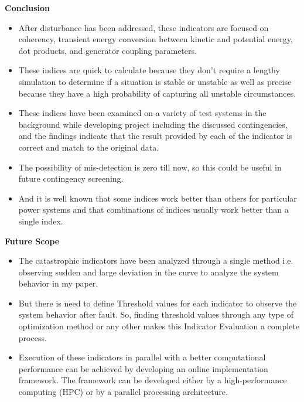 \documentclass [xcolor=svgnames, t] {beamer}
\begin{document}
\begin{frame}{\textbf{Conclusion}}
\begin{itemize} \justifying
\item After disturbance has been addressed, these indicators are focused on coherency, transient energy conversion between kinetic and potential energy, dot products, and generator coupling parameters.
\item These indices are quick to calculate because they don’t require a lengthy simulation to determine if a situation is stable or unstable as well as precise because they have a high probability of capturing all unstable circumstances.
\item These indices have been examined on a variety of test systems in the background while developing project including the discussed contingencies, and the findings indicate that the result provided by each of the indicator is correct and match to the original data. 
\item The possibility of mis-detection is zero till now, so this could be useful in future contingency screening.
\item And it is well known that some indices work better than others for particular power systems and that combinations of indices usually work better than a single index.

\end{itemize}
\end{frame}

\begin{frame}{\textbf{Future Scope
}}
\begin{itemize} \justifying
\item The catastrophic indicators have been analyzed through a single method i.e. observing sudden and large deviation in the curve to analyze the system behavior in my paper. 
\item But there is need to define Threshold values for each indicator to observe the system behavior after fault. So, finding threshold values through any type of optimization method or any other makes this Indicator Evaluation a complete process. 
\item Execution of these indicators in parallel with a better computational performance can be achieved by developing an online implementation framework. The framework can be developed either by a high-performance computing (HPC) or by a parallel processing architecture.


\end{itemize}
\end{frame}
\end{document}
